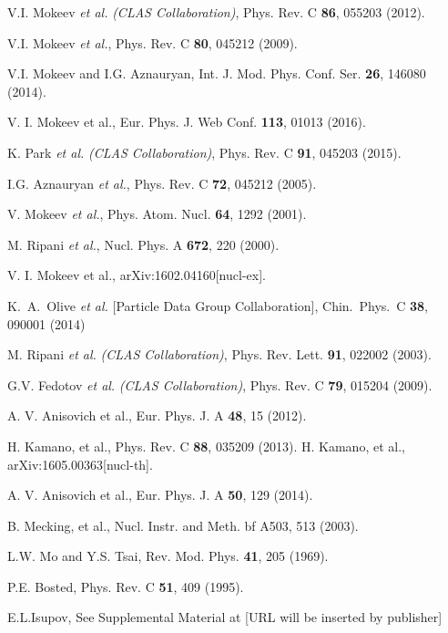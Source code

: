 \begin{thebibliography}{999}
V.I. Mokeev {\it et al.} {\it (CLAS Collaboration)}, Phys. Rev. C {\bf 86}, 055203 (2012).

V.I. Mokeev {\it et al.}, Phys. Rev. C {\bf 80}, 045212 (2009).

V.I. Mokeev and I.G. Aznauryan, Int. J. Mod. Phys. Conf. Ser. {\bf 26}, 146080 (2014).

V. I. Mokeev et al., Eur. Phys. J. Web Conf.  {\bf 113}, 01013 (2016).
%


K. Park {\it et al.} {\it (CLAS Collaboration)}, Phys. Rev. C {\bf 91}, 045203 (2015).


I.G. Aznauryan {\it et al.}, Phys. Rev. C {\bf 72}, 045212 (2005).



V. Mokeev {\it et al.}, Phys. Atom. Nucl. {\bf 64}, 1292 (2001).



M. Ripani {\it et al.}, Nucl. Phys. A {\bf 672}, 220 (2000).



V. I. Mokeev et al., arXiv:1602.04160[nucl-ex].

  K.~A.~Olive {\it et al.}  [Particle Data Group Collaboration],
  Chin.\ Phys.\ C {\bf 38}, 090001 (2014)

M. Ripani {\it et al.} {\it (CLAS Collaboration)}, Phys. Rev. Lett. {\bf 91}, 022002 (2003).

G.V. Fedotov {\it et al.} {\it (CLAS Collaboration)}, Phys. Rev. C {\bf 79}, 015204 (2009).

A. V. Anisovich et al., Eur. Phys. J. A  {\bf 48}, 15 (2012).

H. Kamano, et al., Phys. Rev. C {\bf 88}, 035209 (2013).
H. Kamano, et al., arXiv:1605.00363[nucl-th].

A. V. Anisovich et al., Eur. Phys. J. A  {\bf 50}, 129 (2014).

B. Mecking, et al., Nucl. Instr. and Meth. {bf A503}, 513 (2003).

L.W. Mo and Y.S. Tsai, Rev. Mod. Phys. {\bf 41}, 205 (1969).

P.E. Bosted, Phys. Rev. C {\bf 51}, 409 (1995).

E.L.Isupov, See Supplemental Material at [URL will be inserted by publisher]


\end{thebibliography}
